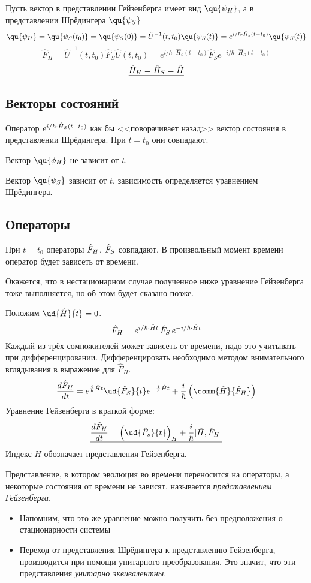 Пусть вектор в представлении Гейзенберга имеет вид $\qu{\psi_H}$, а в представлении Шрёдингера $\qu{\psi_S}$
$$
    \qu{\psi_H} = \qu{\psi_S(t_0)} = \qu{\psi_S(0)} = \hat U^{-1} (t, t_0) \qu{\psi_S (t)}
    = e^{i/\hbar \cdot \Hat H_s (t-t_0)} \qu{\psi_S(t)}
$$
$$
    \hat F_H = \hat U^{-1} (t, t_0) \hat F_S \hat U(t,t_0) = e^{i/\hbar \cdot \hat H_S (t-t_0)}
    \hat F_S e^{-i/\hbar \cdot \hat H_S (t-t_0)}
$$
$$
    \underline{\Hat H_H = \Hat H_S = \hat H}
$$
\subsection{Векторы состояний}
Оператор $e^{i/\hbar \cdot \Hat H_S (t-t_0)}$ как бы <<поворачивает назад>> вектор состояния в представлении Шрёдингера. При $t = t_0$ они совпадают.

Вектор $\qu{\phi_H}$ не зависит от $t$.

Вектор $\qu{\psi_S}$ зависит от $t$, зависимость определяется уравнением Шрёдингера.

\subsection{Операторы}
При $t = t_0$ операторы $\Hat F_H$, $\Hat F_S$ совпадают. В произвольный момент времени оператор будет зависеть от времени.

\Rem Окажется, что в нестационарном случае полученное ниже уравнение Гейзенберга тоже выполняется, но об этом будет сказано позже.

Положим $\ud{\hat H}{t} = 0$.
$$
    \Hat F_H = e^{i/\hbar \cdot \Hat H t} \, \Hat F_S \, e^{-i/\hbar \cdot \Hat H t}
$$
Каждый из трёх сомножителей может зависеть от времени, надо это учитывать при дифференцировании. Дифференцировать необходимо методом внимательного вглядывания в выражение для $\hat F_H$.
$$
    \dfrac{d \Hat F_H}{dt} = e^{\frac{i}{\hbar} \Hat H t} \ud{\Hat F_S}{t} e^{-\frac{i}{\hbar}\Hat H t}
    + \dfrac{i}{\hbar} \left(
        \comm{\Hat H}{\Hat F_H}
    \right)
$$
Уравнение Гейзенберга в краткой форме:
$$
    \underline{\dfrac{d\Hat F_H}{dt} = \left(\ud{\Hat F_s}{t}\right)_H + \dfrac{i}{\hbar} [\Hat H, \Hat F_H]}
$$
Индекс $H$ обозначает представления Гейзенберга.

\Def Представление, в котором эволюция во времени переносится на операторы, а некоторые состояния от времени не зависят, называется \emph{представлением Гейзенберга}.

\Rem
\begin{itemize}
  \item Напомним, что это же уравнение можно получить без предположения о стационарности системы
  \item Переход от представления Шрёдингера к представлению Гейзенберга, производится при помощи унитарного преобразования. Это значит, что эти представления \emph{унитарно эквивалентны}.
\end{itemize}

